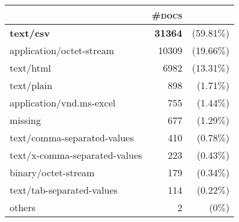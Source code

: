 \begin{tabular}{lrr} 
 \toprule 
 & \textsc{\#docs} & \\ 
 \midrule 
\textbf{text/csv}&\textbf{31364 }&(59.81$\%$)\\ 
  application/octet-stream&10309 &(19.66$\%$)\\ 
  text/html&6982 &(13.31$\%$)\\ 
  text/plain&898 &(1.71$\%$)\\ 
  application/vnd.ms-excel&755 &(1.44$\%$)\\ 
  missing&677 &(1.29$\%$)\\ 
  text/comma-separated-values&410 &(0.78$\%$)\\ 
  text/x-comma-separated-values&223 &(0.43$\%$)\\ 
  binary/octet-stream&179 &(0.34$\%$)\\ 
  text/tab-separated-values&114 &(0.22$\%$)\\ 
  \bottomrule 
others&2 &(0$\%$)\\ 
  \bottomrule 
 \end{tabular}